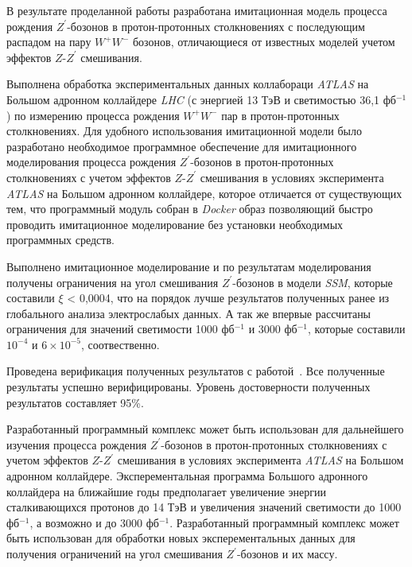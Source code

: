 В результате проделанной работы разработана имитационная модель процесса рождения ${Z}^{\prime}$-бозонов в протон-протонных столкновениях с последующим распадом на пару ${W}^{+}{W}^{-}$ бозонов, отличающиеся от известных моделей учетом эффектов $Z$-${Z}^{\prime}$ смешивания.

Выполнена обработка экспериментальных данных коллабораци  \textit{ATLAS} на Большом адронном коллайдере \textit{LHC} (с энергией 13 ТэВ и светимостью 36,1 фб${}^{−1}$) по измерению процесса рождения ${W}^{+}$${W}^{-}$ пар в протон-протонных столкновениях.
Для удобного использования имитационной модели было разработано необходимое программное обеспечение для имитационного моделирования процесса
рождения ${Z}^{\prime}$-бозонов в протон-протонных столкновениях с учетом эффектов $Z$-${Z}^{\prime}$ смешивания в условиях эксперимента \textit{ATLAS} на Большом адронном коллайдере, которое отличается от существующих тем, что программный модуль собран в \textit{Docker} образ позволяющий быстро проводить имитационное моделирование без установки необходимых программных средств.

Выполнено имитационное моделирование и по результатам моделирования получены ограничения на угол смешивания ${Z}^{\prime}$-бозонов в модели \textit{SSM}, которые составили $\xi$ < 0,0004, что на порядок лучше результатов полученных ранее из глобального анализа электрослабых данных. А так же впервые рассчитаны ограничения для значений светимости 1000 фб${}^{−1}$ и 3000 фб${}^{−1}$, которые составили ${10}^{-4}$ и $6\times{10}^{-5}$, соотвественно.

Проведена верификация полученных результатов с
работой~\cite{2part-pankov}. Все полученные результаты успешно верифицированы. Уровень достоверности полученных результатов составляет 95\%.

Разработанный программный комплекс может быть использован для дальнейшего изучения процесса рождения ${Z}^{\prime}$-бозонов в протон-протонных столкновениях с учетом эффектов $Z$-${Z}^{\prime}$ смешивания в условиях эксперимента \textit{ATLAS} на Большом адронном коллайдере. Эксперементальная программа Большого адронного коллайдера на  ближайшие годы предполагает увеличение энергии сталкивающихся протонов до 14 ТэВ и увеличения значений светимости до 1000 фб${}^{−1}$, а возможно и до 3000 фб${}^{−1}$. Разработанный программный комплекс может быть использован для обработки новых эксперементальных данных для получения ограничений на угол смешивания ${Z}^{\prime}$-бозонов и их массу.